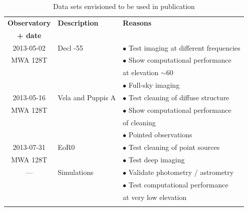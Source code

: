 \documentclass[a4paper,10pt]{article}
\begin{document}
\begin{table}
\caption{Data sets envisioned to be used in publication} \label{tbl:observations}
 \begin{tabular}{|c|l|p{6cm}|}
 \hhline{|=|=|=|}
 \textbf{Observatory} & \textbf{Description} & \textbf{Reasons} \\
 \textbf{+ date} & & \\
 \hhline{|=|=|=|}
  2013-05-02 & Decl -55          & $\bullet$ Test imaging at different frequencies\\
  MWA 128T   &                   & $\bullet$ Show computational performance \\
             &                   & \hspace{5mm} at elevation $\sim 60$\\
             &                   & $\bullet$ Full-sky imaging \\
 \hline
  2013-05-16 & Vela and Puppis A & $\bullet$ Test cleaning of diffuse structure \\
  MWA 128T   &                   & $\bullet$ Show computational performance \\
             &                   & \hspace{5mm} of cleaning\\
             &                   & $\bullet$ Pointed observations \\
 \hline
  2013-07-31 & EoR0              & $\bullet$ Test cleaning of point sources \\
  MWA 128T   &                   & $\bullet$ Test deep imaging \\
 \hline
  ---        & Simulations       & $\bullet$ Validate photometry / astrometry \\
             &                   & $\bullet$ Test computational performance \\
             &                   & \hspace{5mm} at very low elevation\\
 \hhline{|=|=|=|}
\end{tabular}
\end{table}

\label{lastpage}



\end{document}

